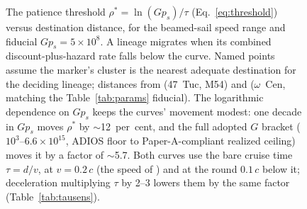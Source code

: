\documentclass[11pt]{article}
\begin{document}
\begin{figure}[tbp]
\centering
{}
\caption{The patience threshold $\rho^{*} = \ln(G p_{s})/\tau$ (Eq.~\ref{eq:threshold}) versus destination distance, for the beamed-sail speed range and fiducial $G p_{s} = 5\times10^{8}$. A lineage migrates when its combined discount-plus-hazard rate falls below the curve. Named points assume the marker's cluster is the nearest adequate destination for the deciding lineage; distances from \citet{BaumgardtVasiliev2021} (47~Tuc, M54) and \citet{Haberle2025oMEGACatVI} ($\omega$~Cen, matching the Table~\ref{tab:params} fiducial). The logarithmic dependence on $G p_{s}$ keeps the curves' movement modest: one decade in $G p_{s}$ moves $\rho^{*}$ by $\sim$12~per~cent, and the full adopted $G$ bracket ($10^{3}$--$6.6\times10^{15}$, ADIOS floor to Paper-A-compliant realized ceiling) moves it by a factor of $\sim$5.7. Both curves use the bare cruise time $\tau = d/v$, at $v = 0.2\,c$ (the speed of \citealt{Hoang2017}) and at the round $0.1\,c$ below it; deceleration multiplying $\tau$ by 2--3 lowers them by the same factor (Table~\ref{tab:tausens}).}
\label{fig:crossover}
\end{figure}
\end{document}
